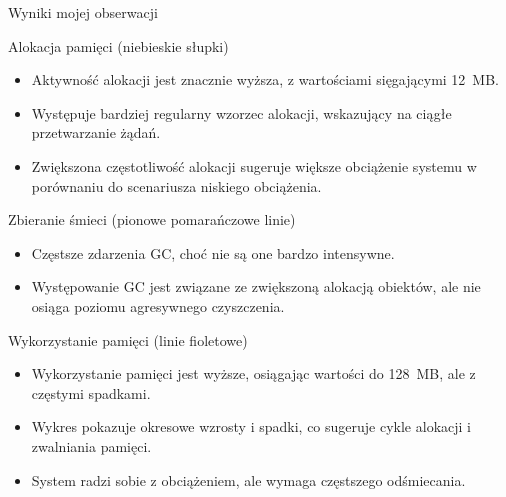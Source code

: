 \documentclass[runningheads,12pt]{llncs}
\begin{document}
Wyniki mojej obserwacji

Alokacja pamięci (niebieskie słupki)

\begin{itemize}
    \item Aktywność alokacji jest znacznie wyższa, z wartościami sięgającymi 12~MB.
    \item Występuje bardziej regularny wzorzec alokacji, wskazujący na ciągłe przetwarzanie żądań.
    \item Zwiększona częstotliwość alokacji sugeruje większe obciążenie systemu w porównaniu do scenariusza niskiego obciążenia.
\end{itemize}

Zbieranie śmieci (pionowe pomarańczowe linie)

\begin{itemize}
    \item Częstsze zdarzenia GC, choć nie są one bardzo intensywne.
    \item Występowanie GC jest związane ze zwiększoną alokacją obiektów, ale nie osiąga poziomu agresywnego czyszczenia.
\end{itemize}

Wykorzystanie pamięci (linie fioletowe)

\begin{itemize}
    \item Wykorzystanie pamięci jest wyższe, osiągając wartości do 128~MB, ale z częstymi spadkami.
    \item Wykres pokazuje okresowe wzrosty i spadki, co sugeruje cykle alokacji i zwalniania pamięci.
    \item System radzi sobie z obciążeniem, ale wymaga częstszego odśmiecania.
\end{itemize}

\end{document}
